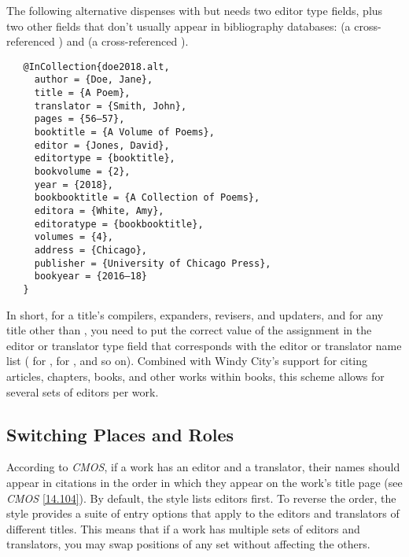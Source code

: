 \documentclass[11pt,letterpaper,oneside]{article}
\begin{document}
\noindent The following alternative dispenses with 
but needs two editor type fields, plus two other fields that don't
usually appear in bibliography databases:  (a
cross-referenced ) and  (a
cross-referenced ).

\begin{verbatim}
   @InCollection{doe2018.alt,
     author = {Doe, Jane},
     title = {A Poem},
     translator = {Smith, John},
     pages = {56–57},
     booktitle = {A Volume of Poems},
     editor = {Jones, David},
     editortype = {booktitle},
     bookvolume = {2},
     year = {2018},
     bookbooktitle = {A Collection of Poems},
     editora = {White, Amy},
     editoratype = {bookbooktitle},
     volumes = {4},
     address = {Chicago},
     publisher = {University of Chicago Press},
     bookyear = {2016–18}
   }
\end{verbatim}

\begin{citebib}
\item \cite[56]{doe2018.alt}
\end{citebib}

In short, for a title's compilers, expanders, revisers, and updaters,
and for any title other than , you need to put the
correct value of the assignment in the editor or translator type field
that corresponds with the editor or translator name list
( for ,
 for , and so on).
Combined with Windy City's support for citing articles, chapters,
books, and other works within books, this scheme allows for several
sets of editors per work.

\subsection{Switching Places and Roles}
\label{editors:swap}

According to \textit{CMOS}, if a work has an editor and a translator,
their names should appear in citations in the order in which they
appear on the work's title page (see \textit{CMOS} \ref{14.104}). By
default, the style lists editors first. To reverse the order, the
style provides a suite of entry options that apply to the editors and
translators of different titles. This means that if a work has
multiple sets of editors and translators, you may swap positions of
any set without affecting the others.
\end{document}
